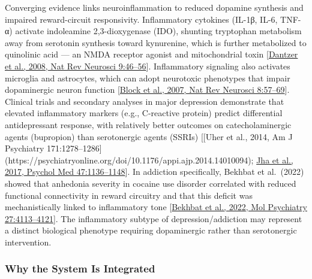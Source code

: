 Converging evidence links neuroinflammation to reduced dopamine synthesis and impaired reward-circuit responsivity. Inflammatory cytokines (IL-1β, IL-6, TNF-α) activate indoleamine 2,3-dioxygenase (IDO), shunting tryptophan metabolism away from serotonin synthesis toward kynurenine, which is further metabolized to quinolinic acid --- an NMDA receptor agonist and mitochondrial toxin {[}\href{https://www.nature.com/articles/nrn2297}{Dantzer et al., 2008, Nat Rev Neurosci 9:46--56}{]}. Inflammatory signaling also activates microglia and astrocytes, which can adopt neurotoxic phenotypes that impair dopaminergic neuron function {[}\href{https://www.nature.com/articles/nrn2038}{Block et al., 2007, Nat Rev Neurosci 8:57--69}{]}. Clinical trials and secondary analyses in major depression demonstrate that elevated inflammatory markers (e.g., C-reactive protein) predict differential antidepressant response, with relatively better outcomes on catecholaminergic agents (bupropion) than serotonergic agents (SSRIs) {[}{[}Uher et al., 2014, Am J Psychiatry 171:1278--1286{]} (https://psychiatryonline.org/doi/10.1176/appi.ajp.2014.14010094); \href{https://pubmed.ncbi.nlm.nih.gov/28090845/}{Jha et al., 2017, Psychol Med 47:1136--1148}{]}. In addiction specifically, Bekhbat et al.~(2022) showed that anhedonia severity in cocaine use disorder correlated with reduced functional connectivity in reward circuitry and that this deficit was mechanistically linked to inflammatory tone {[}\href{https://www.nature.com/articles/s41380-022-01715-3}{Bekhbat et al., 2022, Mol Psychiatry 27:4113--4121}{]}. The inflammatory subtype of depression/addiction may represent a distinct biological phenotype requiring dopaminergic rather than serotonergic intervention.

\subsubsection{Why the System Is Integrated}\label{18_restoration-why-the-system-is-integrated}

